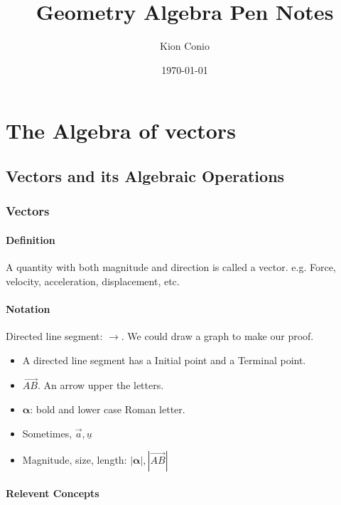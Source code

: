 \documentclass[UTF8]{ctexart}
\title{Geometry Algebra Pen Notes}
\author{Kion Conio}
\date{\today}
\begin{document}
\maketitle
\section{The Algebra of vectors}

\subsection{Vectors and its Algebraic Operations }

\subsubsection{Vectors }
\paragraph{Definition}
A quantity with both magnitude and direction is called a vector. e.g. Force, velocity, acceleration, displacement, etc.

\paragraph{Notation}
Directed line segment: $\rightarrow $. We could draw a graph to make our proof.


\begin{itemize}

\item A directed line segment has a Initial point and a Terminal point.  

\item $\overrightarrow{AB}$. An arrow upper the letters. 

\item $\bm \alpha$: bold and lower case Roman letter.  

\item Sometimes, $\vec a,\underline u$ 

\item Magnitude, size, length: $|\bm \alpha|,|\overrightarrow {AB}|$


\end{itemize}

\paragraph{Relevent Concepts} 
\end{document}
